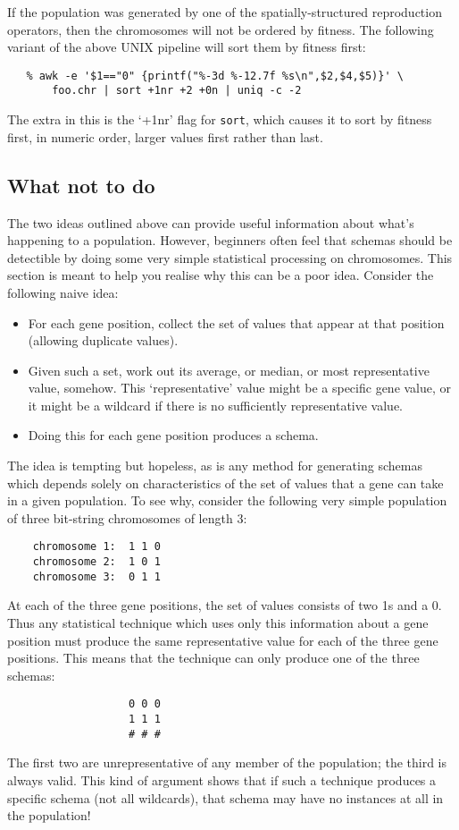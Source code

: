 If the population was generated by one of the spatially-structured
reproduction operators, then the chromosomes will not be ordered by
fitness. The following variant of the above UNIX pipeline will sort
them by fitness first:
\begin{verbatim}
   % awk -e '$1=="0" {printf("%-3d %-12.7f %s\n",$2,$4,$5)}' \
       foo.chr | sort +1nr +2 +0n | uniq -c -2
\end{verbatim}
The extra in this is the `+1nr' flag for \verb|sort|, which causes it to
sort by fitness first, in numeric order, larger values first rather
than last.

\subsection*{What not to do}

The two ideas outlined above can provide useful information about
what's happening to a population. However, beginners often feel
that schemas should be detectible by doing some very simple statistical
processing on chromosomes. This section is meant to help you realise
why this can be a poor idea. Consider the following naive idea:
\begin{itemize}
\item For each gene position, collect the set of values that appear
      at that position (allowing duplicate values).
\item Given such a set, work out its average, or median, or most
      representative value, somehow. This `representative' value might
      be a specific gene value, or it might be a wildcard if there is
      no sufficiently representative value.
\item Doing this for each gene position produces a schema.
\end{itemize}
The idea is tempting but hopeless, as is any method for generating
schemas which depends solely on characteristics of the set of values
that a gene can take in a given population. To see why, consider the
following very simple population of three bit-string chromosomes of
length 3:
\begin{verbatim}
    chromosome 1:  1 1 0
    chromosome 2:  1 0 1
    chromosome 3:  0 1 1
\end{verbatim}
At each of the three gene positions, the set of values consists of
two 1s and a 0. Thus any statistical technique which uses only this
information about a gene position must produce the same representative
value for each of the three gene positions. This means that the
technique can only produce one of the three schemas:
\begin{verbatim}
                   0 0 0
                   1 1 1
                   # # #
\end{verbatim}
The first two are unrepresentative of any member of the population; the
third is always valid. This kind of argument shows that if such a
technique produces a specific schema (not all wildcards), that schema
may have no instances at all in the population!

